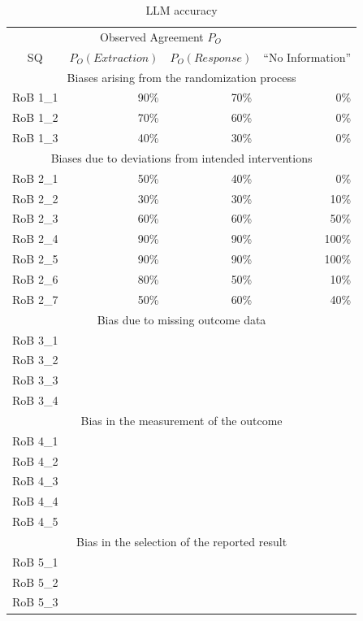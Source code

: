 \documentclass[sn-mathphys,Numbered]{sn-jnl}%
\theoremstyle{thmstyleone}%
\theoremstyle{thmstyletwo}%
\theoremstyle{thmstylethree}%
\begin{document}
%
%
%
\begin{table}[htb]
    \caption{LLM accuracy}
    \label{table:LLM_eval}
    \centering
    \begin{tabular}{crrr}
    \toprule[1.0pt]
     & \multicolumn{2}{c}{Observed Agreement $P_{O}$} \\
        SQ & $P_{O} (Extraction)$ & $P_{O} (Response)$ & ``No Information'' \\ 
    \midrule[1.0pt]
        \multicolumn{4}{c}{Biases arising from the randomization process} \\
        \hline
        RoB 1\_1 & 90\% & 70\% & 0\% \\ 
        RoB 1\_2 & 70\% & 60\% & 0\% \\ 
        RoB 1\_3 & 40\% & 30\% & 0\% \\ 
        \hline
        \multicolumn{4}{c}{Biases due to deviations from intended interventions} \\
        \hline
        RoB 2\_1 & 50\% & 40\% & 0\% \\
        RoB 2\_2 & 30\% & 30\% & 10\% \\ 
        RoB 2\_3 & 60\% & 60\% & 50\% \\ 
        RoB 2\_4 & 90\% & 90\% & 100\% \\ 
        RoB 2\_5 & 90\% & 90\% & 100\% \\ 
        RoB 2\_6 & 80\% & 50\% & 10\% \\ 
        RoB 2\_7 & 50\% & 60\% & 40\% \\
        \hline
        \multicolumn{4}{c}{Bias due to missing outcome data} \\
        \hline
        RoB 3\_1 & & & \\ 
        RoB 3\_2 & & & \\ 
        RoB 3\_3 & & & \\ 
        RoB 3\_4 & & & \\ 
        \hline
        \multicolumn{4}{c}{Bias in the measurement of the outcome} \\
        \hline
        RoB 4\_1 & & & \\ 
        RoB 4\_2 & & & \\ 
        RoB 4\_3 & & & \\ 
        RoB 4\_4 & & & \\ 
        RoB 4\_5 & & & \\ 
        \hline
        \multicolumn{4}{c}{Bias in the selection of the reported result} \\
        \hline
        RoB 5\_1 & & & \\ 
        RoB 5\_2 & & & \\ 
        RoB 5\_3 & & & \\
    \bottomrule[1.0pt]
    \end{tabular}
\end{table}
%
%
%
\end{document}
